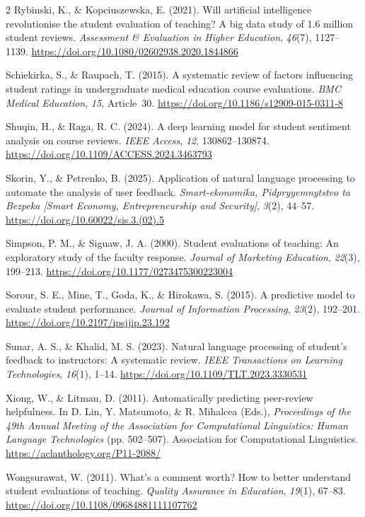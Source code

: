 \documentclass{article}
\begin{document}
\begin{multicols*}{2}
Rybinski, K., \& Kopciuszewska, E. (2021). Will artificial intelligence revolutionise the student evaluation of teaching? A big data study of 1.6 million student reviews. \textit{Assessment \& Evaluation in Higher Education}, \textit{46}(7), 1127--1139. \url{https://doi.org/10.1080/02602938.2020.1844866}

Schiekirka, S., \& Raupach, T. (2015). A systematic review of factors influencing student ratings in undergraduate medical education course evaluations. \textit{BMC Medical Education}, \textit{15}, Article~30. \url{https://doi.org/10.1186/s12909-015-0311-8}

Shuqin, H., \& Raga, R. C. (2024). A deep learning model for student sentiment analysis on course reviews. \textit{IEEE Access}, \textit{12}, 130862--130874. \url{https://doi.org/10.1109/ACCESS.2024.3463793}

Skorin, Y., \& Petrenko, B. (2025). Application of natural language processing to automate the analysis of user feedback. \textit{Smart-ekonomika, Pidpryyemnytstvo ta Bezpeka [Smart Economy, Entrepreneurship and Security]}, \textit{3}(2), 44--57. \url{https://doi.org/10.60022/sis.3.(02).5}

Simpson, P. M., \& Siguaw, J. A. (2000). Student evaluations of teaching: An exploratory study of the faculty response. \textit{Journal of Marketing Education}, \textit{22}(3), 199--213. \url{https://doi.org/10.1177/0273475300223004}

Sorour, S. E., Mine, T., Goda, K., \& Hirokawa, S. (2015). A predictive model to evaluate student performance. \textit{Journal of Information Processing}, \textit{23}(2), 192--201. \url{https://doi.org/10.2197/ipsjjip.23.192}


Sunar, A. S., \& Khalid, M. S. (2023). Natural language processing of student’s feedback to instructors: A systematic review. \textit{IEEE Transactions on Learning Technologies}, \textit{16}(1), 1--14. \url{https://doi.org/10.1109/TLT.2023.3330531} 

Xiong, W., \& Litman, D. (2011). Automatically predicting peer-review helpfulness. In D. Lin, Y. Matsumoto, \& R. Mihalcea (Eds.), \textit{Proceedings of the 49th Annual Meeting of the Association for Computational Linguistics: Human Language Technologies} (pp. 502--507). Association for Computational Linguistics. \url{https://aclanthology.org/P11-2088/}

Wongsurawat, W. (2011). What’s a comment worth? How to better understand student evaluations of teaching. \textit{Quality Assurance in Education}, \textit{19}(1), 67--83. \url{https://doi.org/10.1108/09684881111107762}


\end{multicols*}
\end{document}
